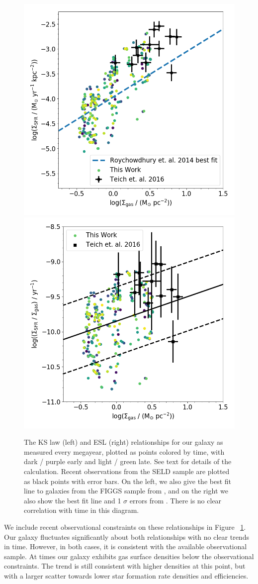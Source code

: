 \documentclass[twocolumn]{aastex61}
\begin{document}
\begin{figure}
\centering
\includegraphics[width=0.475\linewidth]{all_gas_schmidt_law_evolution}
\includegraphics[width=0.475\linewidth]{all_gass_efficiency_evolution}
\caption{The KS law (left) and ESL (right) relationships for our galaxy as measured every megayear, plotted as points colored by time, with dark / purple early and light / green late. See text for details of the calculation.
Recent observations from the SELD sample \citep{Teich2016} are plotted as black points with error bars. On the left, we also give the best fit line to galaxies from the FIGGS sample from \cite{Roychowdhury2014}, and on the right we also show the best fit line and 1 $\sigma$ errors from \cite{Shi2011}.   There is no clear correlation with time in this diagram.}
\label{fig:KS}
\end{figure}

We include recent observational constraints on these relationships in Figure ~\ref{fig:KS}. Our galaxy fluctuates significantly about both relationships with no clear trends in time. However, in both cases, it is consistent with the available observational sample. At times our galaxy exhibits gas surface densities below the observational constraints. The trend is still consistent with higher densities at this point, but with a larger scatter towards lower star formation rate densities and efficiencies.
\end{document}
